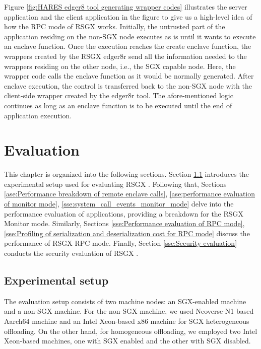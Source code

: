 \documentclass[article, doublespace,nopageskip]{VTthesis} %
\newcommand{\monitor}{RSGX \xspace}
\begin{document}
    Figure \ref{fig:HARES edger8 tool generating wrapper codes} illustrates the server application and the client application in the figure to give us a high-level idea of how the RPC mode of \monitor works. Initially, the untrusted part of the application residing on the non-SGX node executes as is until it wants to execute an enclave function. Once the execution reaches the create enclave function, the wrappers created by the \monitor edger8r send all the information needed to the wrappers residing on the other node, i.e., the SGX capable node. Here, the wrapper code calls the enclave function as it would be normally generated. After enclave execution, the control is transferred back to the non-SGX node with the client-side wrapper created by the edger8r tool. The afore-mentioned logic continues as long as an enclave function is to be executed until the end of application execution. 

    \chapter{Evaluation} \label{ch:Evaluation}
    This chapter is organized into the following sections. Section \ref{ase:experimental setup} introduces the experimental setup used for evaluating \monitor. Following that, Sections \ref{ase:Performance breakdown of remote enclave calls}, \ref{ase:performance evaluation of monitor mode}, \ref{sse:system_call_events_monitor_mode} delve into the performance evaluation of applications, providing a breakdown for the \monitor Monitor mode. Similarly, Sections \ref{sse:Performance evaluation of RPC mode}, \ref{sse:Profiling of serialization and deserialization cost for RPC mode} discuss the performance of \monitor RPC mode. Finally, Section \ref{sse:Security evaluation} conducts the security evaluation of \monitor.
    
    \section{Experimental setup} \label{ase:experimental setup}
    The evaluation setup consists of two machine nodes: an SGX-enabled machine and a non-SGX machine. For the non-SGX machine, we used Neoverse-N1 based Aarch64 machine and an Intel Xeon-based x86 machine for SGX heterogeneous offloading. On the other hand, for homogeneous offloading, we employed two Intel Xeon-based machines, one with SGX enabled and the other with SGX disabled. 
\end{document}
